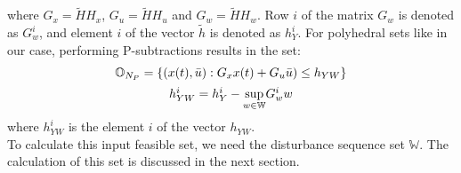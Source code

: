 \documentclass[letterpaper, 10 pt, conference]{ieeeconf}  %
\begin{document}
  where $G_x=\tilde{H}H_x$, $G_u=\tilde{H}H_u$ and $G_w=\tilde{H}H_w$.
  Row $i$ of the matrix $G_w$ is denoted as $G^i_w$, and element $i$ of the vector $\tilde{h}$ is denoted as $h_Y^i$.
   For polyhedral sets like in our case, performing P-subtractions results in the set:
  \begin{equation}
  \begin{matrix}
  \mathbb{O}_{N_P} = \{ (x(t),\bar{u}):G_xx(t)+G_u\bar{u})\leq h_{YW} \} \vspace{5pt} \\ 
  h_{YW}^i = h_Y^i-\underset{w\in \mathbb{W}}{\text{sup}} G_w^i w
  \end{matrix}
  \label{overall}
  \end{equation}
  where $h_{YW}^i$ is the element $i$ of the vector $h_{YW}$.
  \\
  To calculate this input feasible set, we need the disturbance sequence set $\mathbb{W}$. The calculation of this set is discussed in the next section.
\end{document}
